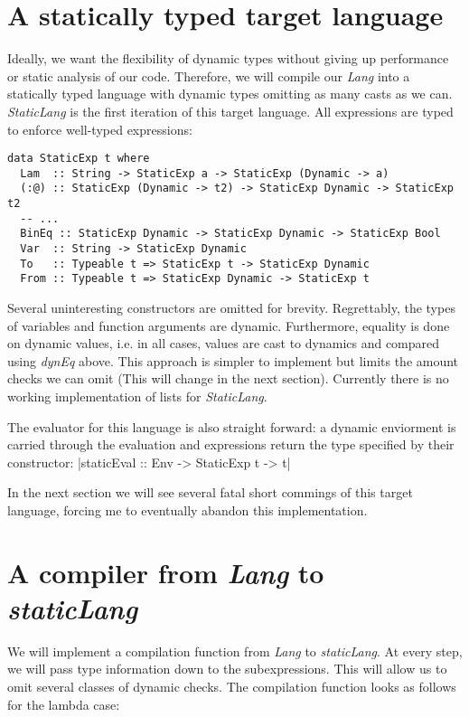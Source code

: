 \documentclass{article}
\begin{document}
\section*{A statically typed target language}
Ideally, we want the flexibility of dynamic types without giving up performance or static analysis of our code. Therefore, we will compile our \textit{Lang} into a statically typed language with dynamic types omitting as many casts as we can. \textit{StaticLang} is the first iteration of this target language. All expressions are typed to enforce well-typed expressions:
\begin{verbatim}
data StaticExp t where
  Lam  :: String -> StaticExp a -> StaticExp (Dynamic -> a)
  (:@) :: StaticExp (Dynamic -> t2) -> StaticExp Dynamic -> StaticExp t2
  -- ...
  BinEq :: StaticExp Dynamic -> StaticExp Dynamic -> StaticExp Bool
  Var  :: String -> StaticExp Dynamic
  To   :: Typeable t => StaticExp t -> StaticExp Dynamic
  From :: Typeable t => StaticExp Dynamic -> StaticExp t
\end{verbatim}
Several uninteresting constructors are omitted for brevity. Regrettably, the types of  variables and function arguments are dynamic. Furthermore, equality is done on dynamic values, i.e. in all cases, values are cast to dynamics and compared using \textit{dynEq} above. This approach is simpler to implement but limits the amount checks we can omit (This will change in the next section). Currently there is no working implementation of lists for \textit{StaticLang}.

The evaluator for this language is also straight forward: a dynamic enviorment is carried through the evaluation and expressions return the type specified by their constructor: |staticEval :: Env -> StaticExp t -> t|

In the next section we will see several fatal short commings of this target language, forcing me to eventually abandon this implementation.

\section*{A compiler from \textit{Lang} to \textit{staticLang}}

We will implement a compilation function from \textit{Lang} to \textit{staticLang}. At every step, we will pass type information down to the subexpressions. This will allow us to omit several classes of dynamic checks. The compilation function looks as follows for the lambda case:
\end{document}
